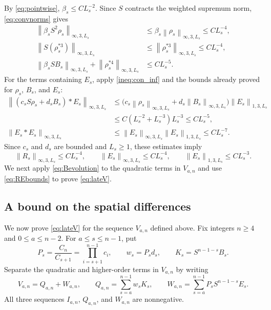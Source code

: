 \documentclass[11pt,letterpaper,reqno]{amsart}
\numberwithin{equation}{section}
\theoremstyle{plain}
\theoremstyle{remark}
\newcommand{\norm}[1]{\left\lVert#1\right\rVert}
\begin{document}
By \eqref{eq:pointwise}, $\beta_s\le CL_s^{-2}$.
Since $S$ contracts the weighted supremum norm,
\eqref{eq:convnorms} gives
\[
 \begin{aligned}
 \norm{\beta_sS^2\rho_s}_{\infty,3,L_s}
 &\le\beta_s\norm{\rho_s}_{\infty,3,L_s}
 \le CL_s^{-4},\\
 \norm{S(\rho_s^{*3})}_{\infty,3,L_s}
 &\le\norm{\rho_s^{*3}}_{\infty,3,L_s}
 \le CL_s^{-4},\\
 \norm{\beta_sSB_s}_{\infty,3,L_s}
 +\norm{\rho_s^{*4}}_{\infty,3,L_s}
 &\le CL_s^{-5}.
 \end{aligned}
\]
For the terms containing $E_s$, apply \eqref{ineq:con_inf} and the bounds
already proved for $\rho_s$, $B_s$, and $E_s$:
\[
 \begin{aligned}
 \norm{(c_sS\rho_s+d_sB_s)*E_s}_{\infty,3,L_s}
 &\le
 \bigl(c_s\norm{\rho_s}_{\infty,3,L_s}
       +d_s\norm{B_s}_{\infty,3,L_s}\bigr)
       \norm{E_s}_{1,3,L_s}\\
 &\le C(L_s^{-2}+L_s^{-3})L_s^{-3}
 \le CL_s^{-5},\\
 \norm{E_s*E_s}_{\infty,3,L_s}
 &\le\norm{E_s}_{\infty,3,L_s}\norm{E_s}_{1,3,L_s}
 \le CL_s^{-7}.
 \end{aligned}
\]
Since $c_s$ and $d_s$ are bounded and $L_s\ge1$, these estimates imply
\begin{equation}\label{eq:REbounds}
 \norm{R_s}_{\infty,3,L_s}\le CL_s^{-4},\qquad
 \norm{E_s}_{\infty,3,L_s}\le CL_s^{-4},\qquad
 \norm{E_s}_{1,3,L_s}\le CL_s^{-3}.
\end{equation}
We next apply \eqref{eq:Bevolution} to the quadratic terms in $V_{a,n}$
and use \eqref{eq:REbounds} to prove \eqref{eq:lateV}.

\subsection{A bound on the spatial differences}

We now prove \eqref{eq:lateV} for the sequence $V_{a,n}$ defined above.
Fix integers $n\ge4$ and $0\le a\le n-2$.
For $a\le s\le n-1$, put
\[
 P_s=\frac{C_n}{C_{s+1}}=\prod_{i=s+1}^{n-1}c_i,\qquad
 w_s=P_sd_s,\qquad K_s=S^{n-1-s}B_s.
\]
Separate the quadratic and higher-order terms in $V_{a,n}$ by writing
\[
 V_{a,n}=Q_{a,n}+W_{a,n},\qquad
 Q_{a,n}=\sum_{s=a}^{n-1}w_sK_s,\qquad
 W_{a,n}=\sum_{s=a}^{n-1}P_sS^{n-1-s}E_s.
\]
All three sequences $I_{a,n}$, $Q_{a,n}$, and $W_{a,n}$ are nonnegative.
\end{document}
